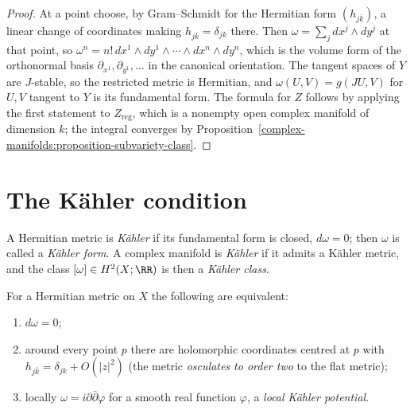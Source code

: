 \begin{proof}
At a point choose, by Gram--Schmidt for the Hermitian form $(h_{j\bar k})$, a linear change of coordinates making $h_{j\bar k} = \delta_{jk}$
there. Then $\omega = \sum_jdx^j \wedge dy^j$ at that point, so
$\omega^n = n!\,dx^1 \wedge dy^1 \wedge \cdots \wedge dx^n \wedge dy^n$, which is the volume form of the orthonormal basis
$\partial_{x^1}, \partial_{y^1}, \ldots$ in the canonical orientation. The tangent spaces of $Y$ are $J$-stable, so the restricted metric is
Hermitian, and $\omega(U, V) = g(JU, V)$ for $U, V$ tangent to $Y$ is its fundamental form. The formula for $Z$ follows by applying the
first statement to $Z_{\mathrm{reg}}$, which is a nonempty open complex manifold of dimension $k$; the integral converges by
Proposition~\ref{complex-manifolds:proposition-subvariety-class}.
\end{proof}

\section{The K\"ahler condition}\label{kahler:section-kahler}

\begin{definition}\label{kahler:definition-kahler}
A Hermitian metric is \emph{K\"ahler} if its fundamental form is closed, $d\omega = 0$; then $\omega$ is called a \emph{K\"ahler form}. A
complex manifold is \emph{K\"ahler} if it admits a K\"ahler metric, and the class $[\omega] \in H^2(X; \RR)$ is then a
\emph{K\"ahler class}.
\end{definition}

\begin{proposition}\label{kahler:proposition-kahler-equivalent}
For a Hermitian metric on $X$ the following are equivalent:
\begin{enumerate}
\item $d\omega = 0$;
\item around every point $p$ there are holomorphic coordinates centred at $p$ with $h_{j\bar k} = \delta_{jk} + O(|z|^2)$ (the metric
\emph{osculates to order two} to the flat metric);
\item locally $\omega = i\partial\bar\partial\varphi$ for a smooth real function $\varphi$, a \emph{local K\"ahler potential}.
\end{enumerate}
\end{proposition}

